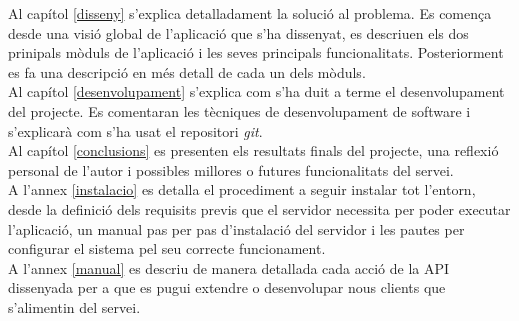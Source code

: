 Al capítol \ref{disseny} s'explica detalladament la solució al problema. Es comença desde una visió global de l'aplicació que s'ha dissenyat, es descriuen els dos prinipals mòduls de l'aplicació i les seves principals funcionalitats. Posteriorment es fa una descripció en més detall de cada un dels mòduls.\\

Al capítol \ref{desenvolupament} s'explica com s'ha duit a terme el desenvolupament del projecte. Es comentaran les tècniques de desenvolupament de software i s'explicarà com s'ha usat el repositori \emph{git}.\\

Al capítol \ref{conclusions} es presenten els resultats finals del projecte, una reflexió personal de l'autor i possibles millores o futures funcionalitats del servei. \\

A l'annex \ref{instalacio} es detalla el procediment a seguir instalar tot l'entorn, desde la definició dels requisits previs que el servidor necessita per poder executar l'aplicació, un manual pas per pas d'instalació del servidor i les pautes per configurar el sistema pel seu correcte funcionament.\\

A l'annex \ref{manual} es descriu de manera detallada cada acció de la API dissenyada per a que es pugui extendre o desenvolupar nous clients que s'alimentin del servei. \\

